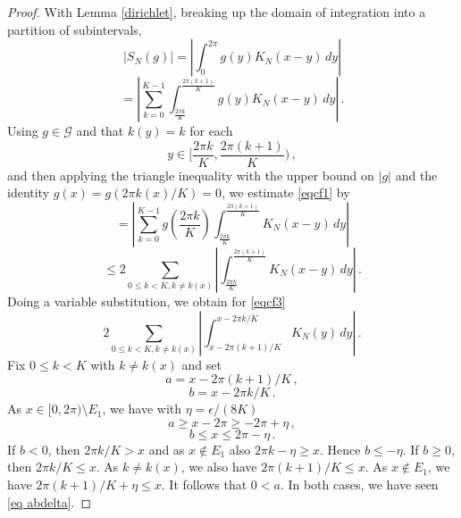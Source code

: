 {\begin{proof}
   With Lemma \ref{dirichlet}, breaking up the domain of integration into a
   partition of subintervals,
   \begin{equation*}
      |S_N(g)|=\left|\int_{0}^{2\pi} g(y)K_N(x-y)\, dy\right|
   \end{equation*}
   \begin{equation}\label{eqcf1}
  =  \left|\sum_{k=0}^{K-1}\int_{\frac{2\pi k}K}^{\frac{2\pi (k+1)}K} g(y)K_N(x-y)\, dy\right|\, .
   \end{equation}
Using $g\in \mathcal{G}$ and that $ k(y)=k$ for each
\begin{equation}
    y\in [\frac {2\pi k}K, \frac{2\pi (k+1)}K)\, ,
\end{equation}
and then applying the triangle inequality with the upper bound on $|g|$ and the identity $g(x)=g(2\pi k(x)/K)=0$,  we estimate \eqref{eqcf1} by
      \begin{equation*}
  =  \left|\sum_{k=0}^{K-1} g(\frac{2\pi k}K) \int_{\frac{2\pi k}K}^{\frac{2\pi (k+1)}K} K_N(x-y)\, dy\right|
   \end{equation*}
      \begin{equation}\label{eqcf3}
  \le 2 \sum_{0\le k<K, k\neq k(x)} \left|\int_{\frac{2\pi k}K}^{\frac{2\pi (k+1)}K} K_N(x-y)\, dy\right|\, .
   \end{equation}
Doing a variable substitution, we obtain for \eqref{eqcf3}
\begin{equation}
  2 \sum_{0\le k<K, k\neq k(x)}
   \left|\int_{x-2\pi (k+1)/K}^{x-2\pi k/K} K_N(y)\, dy\right|\, .
\end{equation}
Fix $0\le k<K$ with $k\neq k(x)$ and set
\begin{equation}
    a=x-2\pi (k+1)/K\, ,
\end{equation}
\begin{equation}
    b=x-2\pi k/K\, .
\end{equation}
As $x\in [0,2\pi)\setminus E_1$, we have
with $\eta=\epsilon/(8K)$
\begin{equation}
    a\ge x-2\pi\ge -2\pi+\eta\, ,
\end{equation}
\begin{equation}
    b\le x \le 2\pi -\eta\, .
\end{equation}
If $b< 0$, then $2\pi k/K> x$ and as $x\not \in E_1$ also
$2\pi k-\eta \ge x$. Hence $b \le -\eta $. If $b\ge 0$, then $2\pi k/K\le x$. As $k\neq k(x)$, we also have
$2\pi (k+1)/K\le x$. As $x\not \in E_1$, we have
$2\pi (k+1)/K+\eta \le x$. It follows that
$0<a$. In both cases, we have seen
\eqref{eq abdelta}.




\end{proof}}
